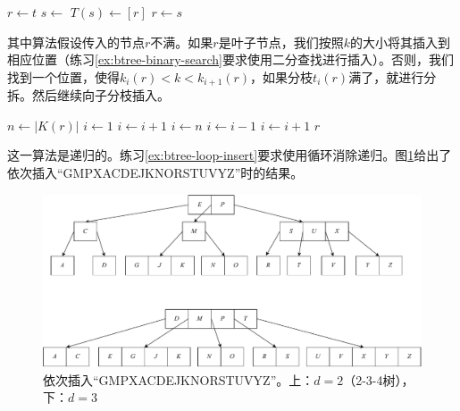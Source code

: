 \documentclass[b5paper]{ctexart}
\begin{document}
\begin{algorithmic}[1]
  \State $r \gets t$
   
    \State $s \gets$ 
    \State $T(s) \gets [ r ]$
    \State {}
    \State $r \gets s$
  \EndIf
  \State \Return {}
\EndFunction
\end{algorithmic}

其中算法假设传入的节点$r$不满。如果$r$是叶子节点，我们按照$k$的大小将其插入到相应位置（练习\cref{ex:btree-binary-search}要求使用二分查找进行插入）。否则，我们找到一个位置，使得$k_i(r) < k < k_{i+1}(r)$，如果分枝$t_i(r)$满了，就进行分拆。然后继续向子分枝插入。

\begin{algorithmic}[1]
  \State $n \gets |K(r)|$
    \State $i \gets 1$
      \State $i \gets i + 1$
    \EndWhile
    \State {}
  \Else
    \State $i \gets n$
      \State $i \gets i - 1$
    \EndWhile
      \State {}
        \State $i \gets i + 1$
      \EndIf
    \EndIf
    \State {}
  \EndIf
  \State \Return $r$
\EndFunction
\end{algorithmic}

这一算法是递归的。练习\cref{ex:btree-loop-insert}要求使用循环消除递归。图\cref{fig:btree-insert}给出了依次插入``GMPXACDEJKNORSTUVYZ''时的结果。

\begin{figure}[htbp]
  \centering
  \includegraphics[scale=0.5]{img/btree-split-insert-example}
  \caption{依次插入``GMPXACDEJKNORSTUVYZ''。上：$d = 2$（2-3-4树），下：$d = 3$}
  \label{fig:btree-insert}
\end{figure}
\end{document}
